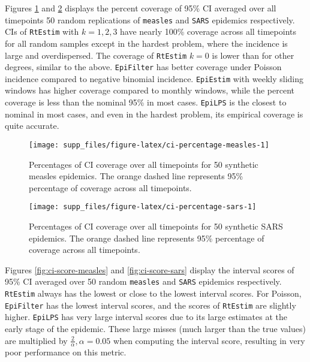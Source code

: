\documentclass[
]{article}
\begin{document}
Figures \ref{fig:ci-percentage-measles} and \ref{fig:ci-percentage-sars}
displays the percent coverage of 95\% CI averaged over all timepoints
50 random replications of \texttt{measles} and \texttt{SARS} epidemics respectively.
CIs of \texttt{RtEstim} with \(k=1,2,3\) have nearly 100\% coverage across all timepoints
for all random samples except in the hardest problem, where the incidence is
large and overdispersed. The coverage of \texttt{RtEstim} \(k=0\) is lower than for other
degrees, similar to the above.
\texttt{EpiFilter} has better coverage under Poisson
incidence compared to negative binomial incidence. \texttt{EpiEstim} with weekly sliding
windows has higher coverage compared to monthly windows, while the percent
coverage is less than the nominal 95\% in most cases.
\texttt{EpiLPS} is the closest to nominal in most cases, and even
in the hardest problem, its empirical coverage is quite accurate.

\begin{figure}[!ht]

{\centering \texttt{[image: supp\_files/figure-latex/ci-percentage-measles-1]} 

}

\caption{Percentages of CI coverage over all timepoints for 50 synthetic measles epidemics. The orange dashed line represents 95\% percentage of coverage across all timepoints.}\label{fig:ci-percentage-measles}
\end{figure}

\begin{figure}[!ht]

{\centering \texttt{[image: supp\_files/figure-latex/ci-percentage-sars-1]} 

}

\caption{Percentages of CI coverage over all timepoints for 50 synthetic SARS epidemics. The orange dashed line represents 95\% percentage of coverage across all timepoints.}\label{fig:ci-percentage-sars}
\end{figure}

Figures \ref{fig:ci-score-measles} and \ref{fig:ci-score-sars} display the
interval scores of 95\% CI averaged over 50 random \texttt{measles} and \texttt{SARS} epidemics
respectively. \texttt{RtEstim} always has the lowest or close to the lowest interval
scores. For Poisson, \texttt{EpiFilter} has the lowest interval scores,
and the scores of \texttt{RtEstim} are slightly higher. \texttt{EpiLPS} has very large interval
scores due to its large estimates at the early stage of the epidemic. These large
misses (much larger than the true values) are multiplied by
\(\frac{2}{\alpha},\alpha=0.05\) when computing the interval score, resulting in
very poor performance on this metric.
\end{document}
